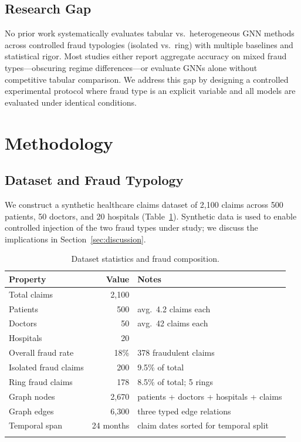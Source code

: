 \documentclass[pdflatex,sn-mathphys-num]{sn-jnl}
\theoremstyle{thmstyleone}
\theoremstyle{thmstyletwo}
\theoremstyle{thmstylethree}
\begin{document}
\subsection{Research Gap}

No prior work systematically evaluates tabular vs.\ heterogeneous GNN
methods across controlled fraud typologies (isolated vs.\ ring) with
multiple baselines and statistical rigor. Most studies either report
aggregate accuracy on mixed fraud types---obscuring regime
differences---or evaluate GNNs alone without competitive tabular
comparison. We address this gap by designing a controlled experimental
protocol where fraud type is an explicit variable and all models are
evaluated under identical conditions.

\section{Methodology}\label{sec:method}

\subsection{Dataset and Fraud Typology}\label{sec:dataset}

We construct a synthetic healthcare claims dataset of 2,100 claims
across 500 patients, 50 doctors, and 20 hospitals (Table~\ref{tab:data}).
Synthetic data is used to enable controlled injection of the two fraud
types under study; we discuss the implications in
Section~\ref{sec:discussion}.

\begin{table}[h]
\caption{Dataset statistics and fraud composition.}\label{tab:data}
\begin{tabular}{@{}lrl@{}}
\toprule
Property & Value & Notes \\
\midrule
Total claims & 2,100 & \\
Patients & 500 & avg.\ 4.2 claims each \\
Doctors & 50 & avg.\ 42 claims each \\
Hospitals & 20 & \\
Overall fraud rate & 18\% & 378 fraudulent claims \\
Isolated fraud claims & 200 & 9.5\% of total \\
Ring fraud claims & 178 & 8.5\% of total; 5 rings \\
Graph nodes & 2,670 & patients + doctors + hospitals + claims \\
Graph edges & 6,300 & three typed edge relations \\
Temporal span & 24 months & claim dates sorted for temporal split \\
\botrule
\end{tabular}
\end{table}
\end{document}
